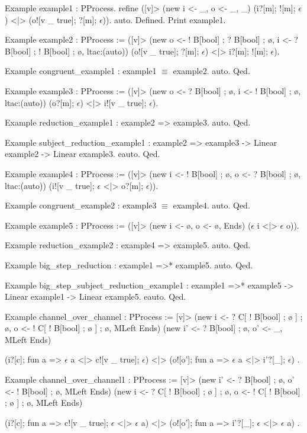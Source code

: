 \documentclass{mproj}
\begin{document}
\begin{coq}
Example example1 : PProcess.
  refine
  ([v]> (new i <- _, o <- _, _)
    (i?[m]; ![m]; $\epsilon$) <|> (o![v _ true]; ?[m]; $\epsilon$)).
  auto.
Defined.
Print example1.

Example example2 : PProcess :=
  ([v]> (new o <- ! B[bool] ; ? B[bool] ; ø, i <- ? B[bool] ; ! B[bool] ; ø, ltac:(auto))
    (o![v _ true]; ?[m]; $\epsilon$) <|> i?[m]; ![m]; $\epsilon$).

Example congruent_example1 : example1 $\equiv$ example2. auto. Qed.

Example example3 : PProcess :=
  ([v]> (new o <- ? B[bool] ; ø, i <- ! B[bool] ; ø, ltac:(auto))
    (o?[m]; $\epsilon$) <|> i![v _ true]; $\epsilon$).

Example reduction_example1 : example2 => example3. auto. Qed.

Example subject_reduction_example1 : example2 => example3 -> Linear example2 -> Linear example3.
eauto.
Qed.

Example example4 : PProcess :=
  ([v]> (new i <- ! B[bool] ; ø, o <- ? B[bool] ; ø, ltac:(auto))
    (i![v _ true]; $\epsilon$ <|> o?[m]; $\epsilon$)).

Example congruent_example2 : example3 $\equiv$ example4. auto. Qed.

Example example5 : PProcess :=
  ([v]> (new i <- ø, o <- ø, Ends) ($\epsilon$ i <|> $\epsilon$ o)).

Example reduction_example2 : example4 => example5. auto. Qed.

Example big_step_reduction : example1 =>* example5. auto. Qed.

Example big_step_subject_reduction_example1
  : example1 =>* example5 -> Linear example1 -> Linear example5.
eauto.
Qed.

Example channel_over_channel : PProcess :=
  [v]>
    (new i <- ? C[ ! B[bool] ; ø ] ; ø, o <- ! C[ ! B[bool] ; ø ] ; ø, MLeft Ends)
    (new i' <- ? B[bool] ; ø, o' <- _, MLeft Ends)

    (i?[c]; fun a => $\epsilon$ a <|> c![v _ true]; $\epsilon$)
    <|>
    (o![o']; fun a => $\epsilon$ a <|> i'?[_]; $\epsilon$)
.

Example channel_over_channel1 : PProcess :=
  [v]>
    (new i' <- ? B[bool] ; ø, o' <- ! B[bool] ; ø, MLeft Ends)
    (new i <- ? C[ ! B[bool] ; ø ] ; ø, o <- ! C[ ! B[bool] ; ø ] ; ø, MLeft Ends)

    (i?[c]; fun a => c![v _ true]; $\epsilon$ <|> $\epsilon$ a)
    <|>
    (o![o']; fun a => i'?[_]; $\epsilon$ <|> $\epsilon$ a)
.


\end{coq}
\end{document}
